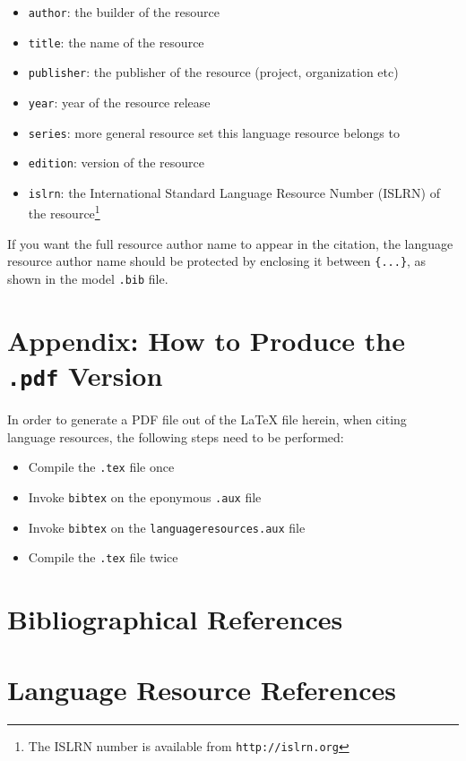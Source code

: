 \documentclass[10pt, a4paper]{article}
\begin{document}
\begin{itemize}
    \item{\texttt{author}: the builder of the resource}
    \item{\texttt{title}: the name of the resource}
    \item{\texttt{publisher}: the publisher of the resource (project,
          organization etc)}
    \item{\texttt{year}: year of the resource release}
    \item{\texttt{series}: more general resource set this language resource
          belongs to}
    \item{\texttt{edition}: version of the resource}
    \item{\texttt{islrn}: the International Standard Language Resource Number
          (ISLRN) of the resource\footnote{The ISLRN number is available from
          \texttt{http://islrn.org}}} 
\end{itemize}

If you want the full resource author name to appear in the citation, the
language resource author name should be protected by enclosing it between
\texttt{\{...\}}, as shown in the model \texttt{.bib} file.

\section*{Appendix: How to Produce the \texttt{.pdf} Version}

In order to generate a PDF file out of the LaTeX file herein, when citing
language resources, the following steps need to be performed:

\begin{itemize}
    \item{Compile the \texttt{.tex} file once}
    \item{Invoke \texttt{bibtex} on the eponymous \texttt{.aux} file}
    \item{Invoke \texttt{bibtex} on the \texttt{languageresources.aux} file}
    \item{Compile the \texttt{.tex} file twice}
\end{itemize}

\section{Bibliographical References}
\label{main:ref}





\section{Language Resource References}
\label{lr:ref}
\end{document}
